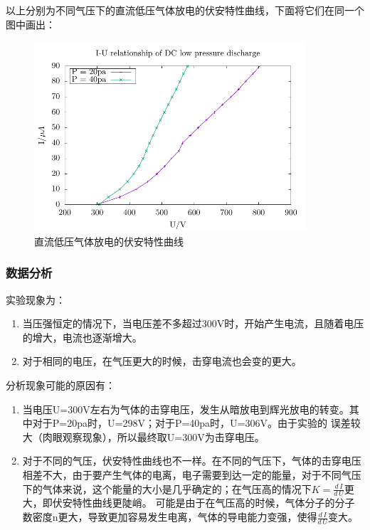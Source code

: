 \documentclass[a4paper,UTF8]{ctexart}
\begin{document}
以上分别为不同气压下的直流低压气体放电的伏安特性曲线，下面将它们在同一个图中画出：

\begin{figure}[H]
    \centering
    \begin{minipage}[b]{0.9\textwidth}
        \centering
        \includegraphics[width=0.9\textwidth]{./pic4.pdf}
        \caption{直流低压气体放电的伏安特性曲线}
    \end{minipage}
\end{figure}

\subsubsection{数据分析}

实验现象为：

\begin{enumerate}
    \item 当压强恒定的情况下，当电压差不多超过300V时，开始产生电流，且随着电压的增大，电流也逐渐增大。
    \item 对于相同的电压，在气压更大的时候，击穿电流也会变的更大。
\end{enumerate}

分析现象可能的原因有：

\begin{enumerate}
    \item 当电压U=300V左右为气体的击穿电压，发生从暗放电到辉光放电的转变。其中对于P=20pa时，U=298V；对于P=40pa时，U=306V。由于实验的
    误差较大（肉眼观察现象），所以最终取U=300V为击穿电压。
    \item 对于不同的气压，伏安特性曲线也不一样。在不同的气压下，气体的击穿电压相差不大，由于要产生气体的电离，电子需要到达一定的能量，对于不同气压下的气体来说，这个能量的大小是几乎确定的；在气压高的情况下$K=\frac{d\,I}{d\,U}$更大，即伏安特性曲线更陡峭。
    可能是由于在气压高的时候，气体分子的分子数密度n更大，导致更加容易发生电离，气体的导电能力变强，使得$\frac{d\,I}{d\,U}$变大。
\end{enumerate}
\end{document}
